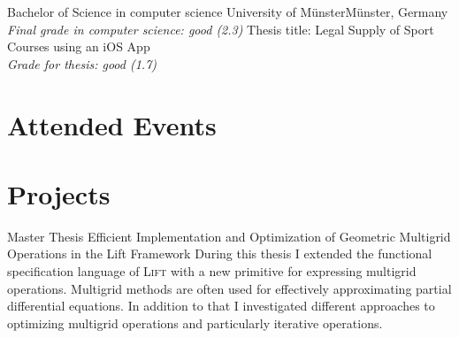 \documentclass[11pt,a4paper,sans]{moderncv}        %
\newcommand{\Lift}{\textsc{Lift}\xspace}
\begin{document}
                        {Bachelor of Science in computer science}
					{University of Münster}{Münster, Germany}
					{\textit{Final grade in computer science: good (2.3)}}
					{Thesis title: Legal Supply of Sport Courses using an iOS App \\
					 \textit{Grade for thesis: good (1.7)}
					}
					
					

\section{Attended Events}




\section{Projects}
					{Master Thesis}
					{Efficient Implementation and Optimization of Geometric Multigrid Operations in the Lift Framework}{}
					{}
					{During this thesis I extended the functional specification language of \Lift with a new primitive for expressing multigrid operations. Multigrid methods are often used for effectively approximating partial differential equations. In addition to that I investigated different approaches to optimizing multigrid operations and particularly iterative operations.}
    
\end{document}
